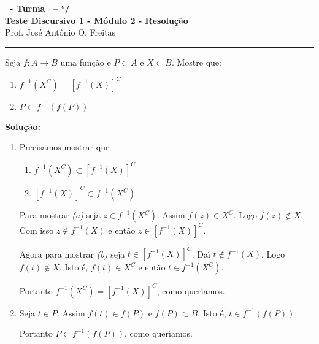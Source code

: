 \documentclass[12pt]{exam}
\begin{document}
	\begin{center}
	{\Large\bf \disciplina\ - Turma \turma\ -- \semestre$^{o}$/\ano} \\ \vspace{9pt} {\large\bf
	Teste Discursivo 1 - M\'odulo 2 - Resolu\c{c}\~ao}\\
	\vspace{9pt} Prof. Jos{\'e} Ant{\^o}nio O. Freitas
	\end{center}
	\hrule

	\vspace{.6cm}

	Seja $f : A \to B$ uma fun\c{c}\~ao e $P \subset A$ e $X \subset B$. Mostre que:
	\begin{enumerate}[label={\arabic*})]
		\item $f^{-1}(X^C) = [f^{-1}(X)]^C$

		\item $P \subset f^{-1}(f(P))$
	\end{enumerate}

	\noindent\textbf{Solu\c{c}\~ao:}

	\begin{enumerate}[label={\arabic*})]
		\item Precisamos mostrar que
		\begin{enumerate}
			\item $f^{-1}(X^C) \subset [f^{-1}(X)]^C$

			\item $[f^{-1}(X)]^C \subset f^{-1}(X^C)$
		\end{enumerate}

		Para mostrar \textit{(a)} seja $z \in f^{-1}(X^C)$. Assim $f(z) \in X^C$. Logo $f(z) \notin	X$. Com isso $z \notin f^{-1}(X)$ e ent\~ao $z \in [f^{-1}(X)]^C$.

		Agora para mostrar \textit{(b)} seja $t \in [f^{-1}(X)]^C$. Da{\'\i} $t \notin f^{-1}(X)$. Logo $f(t) \notin X$. Isto \'e, $f(t) \in X^C$ e ent\~ao $t \in f^{-1}(X^C)$.

		Portanto $f^{-1}(X^C) = [f^{-1}(X)]^C$, como quer{\'\i}amos.

		\item Seja $t \in P$. Assim $f(t) \in f(P)$ e $f(P) \subset B$. Isto \'e, $t \in f^{-1}(f(P))$.

		Portanto $P \subset f^{-1}(f(P))$, como quer{\'\i}amos.
	\end{enumerate}
\end{document}

